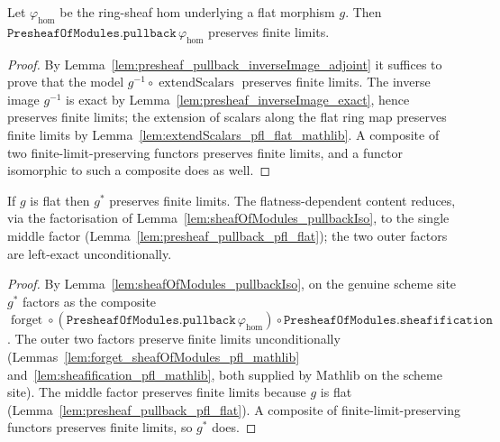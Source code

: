 \begin{lemma}
  \label{lem:presheaf_pullback_pfl_flat}
  Let \(\varphi_{\mathrm{hom}}\) be the ring-sheaf hom underlying a flat morphism
  \(g\). Then \(\texttt{PresheafOfModules.pullback}\,\varphi_{\mathrm{hom}}\) preserves
  finite limits.
\end{lemma}

\begin{proof}
  By Lemma~\ref{lem:presheaf_pullback_inverseImage_adjoint} it suffices to prove that
  the model \(g^{-1} \circ \operatorname{extendScalars}\) preserves finite limits. The
  inverse image \(g^{-1}\) is exact by
  Lemma~\ref{lem:presheaf_inverseImage_exact}, hence preserves finite limits; the
  extension of scalars along the flat ring map preserves finite limits by
  Lemma~\ref{lem:extendScalars_pfl_flat_mathlib}. A composite of two
  finite-limit-preserving functors preserves finite limits, and a functor isomorphic
  to such a composite does as well.
\end{proof}

\begin{lemma}

  \label{lem:pullback_preserves_finite_limits}
  If \(g\) is flat then \(g^*\) preserves finite limits. The flatness-dependent
  content reduces, via the factorisation of
  Lemma~\ref{lem:sheafOfModules_pullbackIso}, to the single middle factor
  (Lemma~\ref{lem:presheaf_pullback_pfl_flat}); the two outer factors are left-exact
  unconditionally.
\end{lemma}

\begin{proof}
  By Lemma~\ref{lem:sheafOfModules_pullbackIso}, on the genuine scheme site \(g^*\)
  factors as the composite
  \(\operatorname{forget} \circ
  (\texttt{PresheafOfModules.pullback}\,\varphi_{\mathrm{hom}}) \circ
  \texttt{PresheafOfModules.sheafification}\). The outer two factors preserve finite
  limits unconditionally (Lemmas~\ref{lem:forget_sheafOfModules_pfl_mathlib}
  and~\ref{lem:sheafification_pfl_mathlib}, both supplied by Mathlib on the scheme
  site). The middle factor preserves finite limits because \(g\) is flat
  (Lemma~\ref{lem:presheaf_pullback_pfl_flat}). A composite of
  finite-limit-preserving functors preserves finite limits, so \(g^*\) does.
\end{proof}

